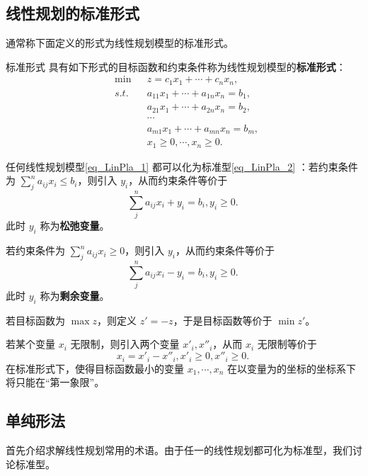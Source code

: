\subsection{线性规划的标准形式}
通常称下面定义的形式为线性规划模型的标准形式。
\begin{definition}{标准形式}
具有如下形式的目标函数和约束条件称为线性规划模型的\textbf{标准形式}：
\begin{equation}\label{eq_LinPla_2}
\begin{aligned}
&\min  &&z=c_1x_1+\cdots +c_nx_n,\\
&s.t. &&a_{11}x_1+\cdots+a_{1n}x_n=b_1,\\
&&&a_{21}x_1+\cdots+a_{2n}x_n=b_2,\\
&&&\cdots\\
&&&a_{m1}x_1+\cdots+a_{mn}x_n=b_m,\\
&&&x_1\geq0,\cdots,x_n\geq0.
\end{aligned}~
\end{equation}

\end{definition}
任何线性规划模型\autoref{eq_LinPla_1} 都可以化为标准型\autoref{eq_LinPla_2} ：若约束条件为 $\sum_{j}^na_{ij} x_i\leq b_i$，则引入 $y_{i}$，从而约束条件等价于
\begin{equation}
\sum_{j}^na_{ij} x_i+y_i= b_i,y_i\geq 0.~
\end{equation}
此时 $y_i$ 称为\textbf{松弛变量}。

若约束条件为 $\sum_{j}^na_{ij} x_i\geq 0$，则引入 $y_{i}$，从而约束条件等价于
\begin{equation}
\sum_{j}^na_{ij} x_i-y_i= b_i,y_i\geq 0.~
\end{equation}
此时 $y_i$ 称为\textbf{剩余变量}。

若目标函数为 $\max z$，则定义 $z'=-z$，于是目标函数等价于 $\min z'$。

若某个变量 $x_i$ 无限制，则引入两个变量 $x'_i,x''_i$，从而 $x_i$ 无限制等价于 
\begin{equation}
x_i=x'_i-x''_i,x'_i\geq0,x''_i\geq0.~
\end{equation}
在标准形式下，使得目标函数最小的变量 $x_1,\cdots,x_n$ 在以变量为的坐标的坐标系下将只能在“第一象限”。


\subsection{单纯形法}

首先介绍求解线性规划常用的术语。由于任一的线性规划都可化为标准型，我们讨论标准型。

